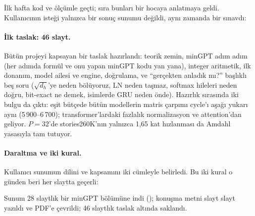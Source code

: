 
\neden
İlk hafta kod ve ölçümle geçti; sıra bunları bir hocaya anlatmaya geldi. Kullanıcının isteği yalnızca bir sonuç sunumu değildi, aynı zamanda bir sınavdı:


\neyapildi
\paragraph{İlk taslak: 46 slayt.} Bütün projeyi kapsayan bir taslak hazırlandı: teorik zemin, minGPT adım adım (her adımda formül ve onu yapan minGPT kodu yan yana), integer aritmetik, ilk donanım, model ailesi ve engine, doğrulama, ve “gerçekten anladık mı?” başlıklı beş soru ($\sqrt{d_h}$'ye neden bölüyoruz, LN neden taşmaz, softmax hileleri neden doğru, bit-exact ne demek, isimlerde GRU neden önde). Hazırlık sırasında iki bulgu da çıktı: eşit bütçede bütün modellerin matris çarpımı cycle'ı aşağı yukarı aynı (5\,900–6\,700); transformer'lardaki fazlalık normalizasyon ve attention'dan geliyor. $P=32$'de stories260K'nın yalnızca 1,65 kat hızlanması da Amdahl yasasıyla tam tutuyor.

\paragraph{Daraltma ve iki kural.} Kullanıcı sunumun dilini ve kapsamını iki cümleyle belirledi. Bu iki kural o günden beri her slaytta geçerli:


Sunum 28 slaytlık bir minGPT bölümüne indi (); konuşma metni slayt slayt yazıldı ve PDF'e çevrildi; 46 slaytlık taslak  altında saklandı.

